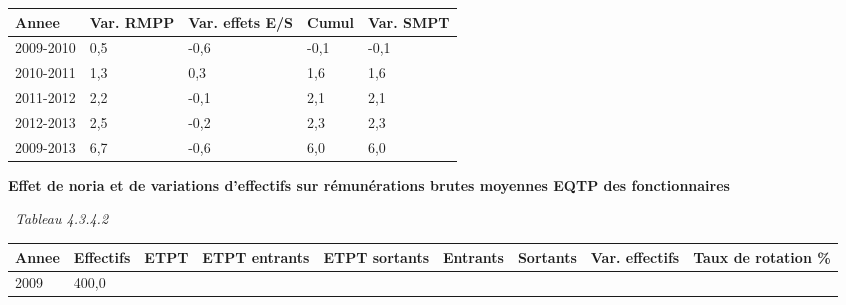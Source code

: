 \begin{longtable}[]{@{}lllll@{}}
\toprule
Annee & Var. RMPP & Var. effets E/S & Cumul & Var. SMPT\tabularnewline
\midrule
\endhead
2009-2010 & 0,5 & -0,6 & -0,1 & -0,1\tabularnewline
2010-2011 & 1,3 & 0,3 & 1,6 & 1,6\tabularnewline
2011-2012 & 2,2 & -0,1 & 2,1 & 2,1\tabularnewline
2012-2013 & 2,5 & -0,2 & 2,3 & 2,3\tabularnewline
2009-2013 & 6,7 & -0,6 & 6,0 & 6,0\tabularnewline
\bottomrule
\end{longtable}

\textbf{Effet de noria et de variations d'effectifs sur rémunérations
brutes moyennes EQTP des fonctionnaires}

~\emph{Tableau 4.3.4.2}

\begin{longtable}[]{@{}lllllllll@{}}
\toprule
\begin{minipage}[b]{0.05\columnwidth}\raggedright
Annee\strut
\end{minipage} & \begin{minipage}[b]{0.08\columnwidth}\raggedright
Effectifs\strut
\end{minipage} & \begin{minipage}[b]{0.05\columnwidth}\raggedright
ETPT\strut
\end{minipage} & \begin{minipage}[b]{0.10\columnwidth}\raggedright
ETPT entrants\strut
\end{minipage} & \begin{minipage}[b]{0.10\columnwidth}\raggedright
ETPT sortants\strut
\end{minipage} & \begin{minipage}[b]{0.07\columnwidth}\raggedright
Entrants\strut
\end{minipage} & \begin{minipage}[b]{0.07\columnwidth}\raggedright
Sortants\strut
\end{minipage} & \begin{minipage}[b]{0.11\columnwidth}\raggedright
Var. effectifs\strut
\end{minipage} & \begin{minipage}[b]{0.14\columnwidth}\raggedright
Taux de rotation \%\strut
\end{minipage}\tabularnewline
\midrule
\endhead
\begin{minipage}[t]{0.05\columnwidth}\raggedright
2009\strut
\end{minipage} & \begin{minipage}[t]{0.08\columnwidth}\raggedright
400,0\strut

\end{minipage}
\end{longtable}
